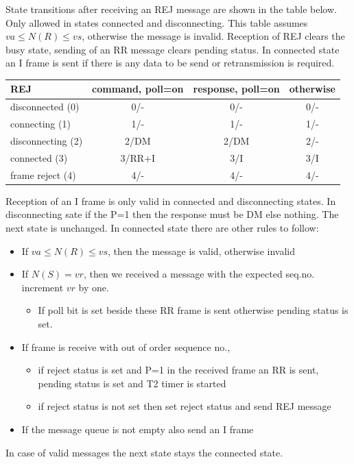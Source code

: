 \documentclass[a4paper]{article}
\begin{document}
State transitions after receiving an REJ message are shown in the table below. Only allowed in states connected and
disconnecting. This table assumes $va \leq N(R) \leq vs$, otherwise the message is invalid. Reception of REJ clears the
busy state, sending of an RR message clears pending status. In connected state an I frame is sent if there is any data
to be send or retransmission is required.

{\footnotesize
\begin{center}
    \begin{tabular}{|l|c|c|c|}
        \hline
        REJ               & command, poll=on & response, poll=on & otherwise  \\
        \hline
        disconnected (0)  & 0/-              & 0/-               & 0/-        \\
        \hline
        connecting (1)    & 1/-              & 1/-               & 1/-        \\
        \hline
        disconnecting (2) & 2/DM             & 2/DM              & 2/-        \\
        \hline
        connected (3)     & 3/RR+I           & 3/I               & 3/I        \\
        \hline
        frame reject (4)  & 4/-              & 4/-               & 4/-        \\
        \hline
    \end{tabular}
\end{center}
}

Reception of an I frame is only valid in connected and disconnecting states. In disconnecting sate if the P=1 then the
response must be DM else nothing. The next state is unchanged. In connected state there are other rules to follow:

\begin{itemize}
    \item If $va \leq N(R) \leq vs$, then the message is valid, otherwise invalid
    \item If $N(S) = vr$, then we received a message with the expected seq.no. increment $vr$ by one.
          \begin{itemize}
              \item  If poll bit is set beside these RR frame is sent otherwise pending status is set.
          \end{itemize}
    \item If frame is receive with out of order sequence no.,
          \begin{itemize}
              \item if reject status is set and P=1 in the received frame an RR is sent, pending status is set and T2
                    timer is
                    started
              \item if reject status is not set then set reject status and send REJ message
          \end{itemize}
    \item If the message queue is not empty also send an I frame
\end{itemize}
In case of valid messages the next state stays the connected state.
\end{document}
